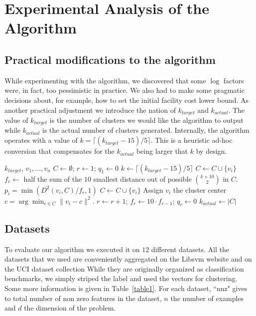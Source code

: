 \documentclass[11pt,twoside]{article}
\newcommand{\kmeans}{$k$-means}
\def\tab{\hspace{5mm}}
\begin{document}
\section{Experimental Analysis of the Algorithm}
\subsection{Practical modifications to the algorithm}
While experimenting with the algorithm, we discovered that some $\log$ factors were, in fact, too pessimistic in practice.
We also had to make some pragmatic decisions about, for example, how to set the initial facility cost lower bound.
As another practical adjustment we introduce the nation of $k_{target}$ and $k_{actual}$.
The value of $k_{target}$ is the number of clusters we would like the algorithm to output while $k_{actual}$ is the actual number of clusters generated.
Internally, the algorithm operates with a value of $k = \lceil(k_{target}-15)/5\rceil$. 
This is a heuristic ad-hoc conversion that compensates for the $k_{actual}$ being larger that $k$ by design.

\begin{algorithm}
\begin{algorithmic}
 $k_{target}$,  $v_1,\ldots,v_n$
\STATE $C \gets \emptyset$;\;\; $r \gets 1$;\;\; $q_1 \gets 0$
\STATE $k \gets \lceil(k_{target}-15)/5\rceil$
	\STATE \tab $C \gets C \cup \{v_i\}$
\ENDFOR
\STATE $f_r\gets$ half the sum of the $10$ smallest distance out of possible ${k+10 \choose 2}$ in $C$.
	 $p_i = \min(D^2(v_i, C)/f_r,1)$
	\STATE \tab $C \gets C \cup \{v_i\}$
	\STATE Assign $v_i$ the cluster center $c = \arg\min_{c \in C}\|v_i - c\|^2$.
		\STATE $r \gets r+1$;\;\;  $f_r \gets 10\cdot f_{r-1}$;\;\; $q_r \gets 0$
	\ENDIF
\ENDFOR
\STATE $k_{actual} \gets |C|$
\caption{Heuristic online \kmeans, practical but unprovable.}\label{alg2}
\end{algorithmic}
\end{algorithm}

\subsection{Datasets}
To evaluate our algorithm we executed it on $12$ different datasets.
All the datasets that we used are conveniently aggregated on the Libsvm website \cite{libsvmData} and on the UCI dataset collection \cite{UCIdata}
While they are originally organized as classification benchmarks, we simply striped the label and used the vectors for clustering.
Some more information is given in Table~\ref{table1}. 
For each dataset, ``nnz" gives to total number of non zero features in the dataset, $n$ the number of examples and $d$ the dimension of the problem.
\end{document}
